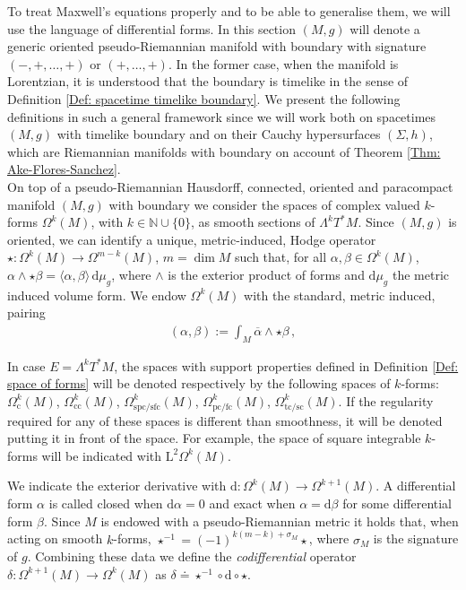 To treat Maxwell's equations properly and to be able to generalise them, we will use the language of differential forms.
In this section $(M,g)$ will denote a generic oriented pseudo-Riemannian manifold with boundary with signature $(-,+,\dots,+)$ or $(+,\dots,+)$. In the former case, when the manifold is Lorentzian, it is understood that the boundary is timelike in the sense of Definition \ref{Def: spacetime timelike boundary}. We present the following definitions in such a general framework since we will work both on spacetimes $(M,g)$ with timelike boundary and on their Cauchy hypersurfaces $(\Sigma,h)$, which are Riemannian manifolds with boundary on account of Theorem \ref{Thm: Ake-Flores-Sanchez}.\\



On top of a pseudo-Riemannian Hausdorff, connected, oriented and paracompact manifold $(M,g)$ with boundary we consider the spaces of complex valued $k$-forms $\Omega^k(M)$, with $k\in\mathbb{N}\cup \{0\}$, as smooth sections of $\Lambda^kT^*M$. Since $(M,g)$ is oriented, we can identify a unique, metric-induced, Hodge operator $\star:\Omega^k(M)\to\Omega^{m-k}(M)$, $m=\dim M$ such that, for all $\alpha,\beta\in\Omega^k(M)$, $\alpha\wedge\star\beta=\langle\alpha,\beta\rangle\,\mathrm{d}\mu_g$, where $\wedge$ is the exterior product of forms and $\mathrm{d}\mu_g$ the metric induced volume form. We endow $\Omega^k(M)$ with the standard, metric induced, pairing
\begin{align}\label{Eqn: pairing on M}
(\alpha,\beta):=\int_M\overline{\alpha}\wedge\star\beta\,,
\end{align}


\begin{remark}\label{Rem: space of forms}
	In case $E=\Lambda^kT^\ast M$, the spaces with support properties defined in Definition \ref{Def: space of forms} will be denoted respectively by the following spaces of $k$-forms: $\Omega_\mathrm{c}^k(M)$, $\Omega_{\mathrm{cc}}^k(M)$, $\Omega_{\mathrm{spc}/\mathrm{sfc}}^k(M)$, $\Omega_{\mathrm{pc}/\mathrm{fc}}^k(M)$, $\Omega_{\mathrm{tc}/\mathrm{sc}}^k(M)$. If the regularity required for any of these spaces is different than smoothness, it will be denoted putting it in front of the space. For example, the space of square integrable $k$-forms will be indicated with $\mathrm{L}^2\Omega^k(M)$.
\end{remark}


We indicate the exterior derivative with $\mathrm{d}:\Omega^k(M)\to\Omega^{k+1}(M)$. A differential form $\alpha$ is called closed when $\mathrm{d}\alpha=0$ and exact when $\alpha=\mathrm{d}\beta$ for some differential form $\beta$. Since $M$ is endowed with a pseudo-Riemannian metric it holds that, when acting on smooth $k$-forms, $\star^{-1}=(-1)^{k(m-k)+\sigma_M}\star$, where $\sigma_M$ is the signature of $g$. Combining these data we define the {\em codifferential} operator $\delta:\Omega^{k+1}(M)\to\Omega^k(M)$ as $\delta\doteq\star^{-1}\circ \mathrm{d}\circ\star$.

